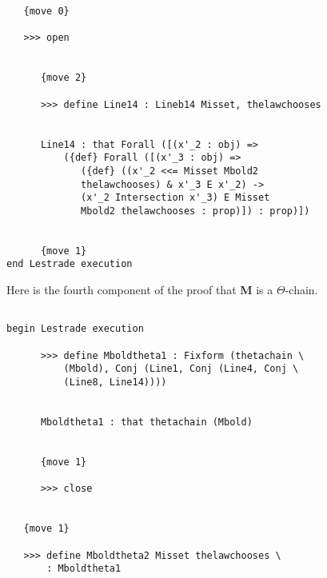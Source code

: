 \documentclass[12pt]{article}
\begin{document}
\begin{verbatim}
   {move 0}

   >>> open


      {move 2}

      >>> define Line14 : Lineb14 Misset, thelawchooses


      Line14 : that Forall ([(x'_2 : obj) => 
          ({def} Forall ([(x'_3 : obj) => 
             ({def} ((x'_2 <<= Misset Mbold2 
             thelawchooses) & x'_3 E x'_2) -> 
             (x'_2 Intersection x'_3) E Misset 
             Mbold2 thelawchooses : prop)]) : prop)])


      {move 1}
end Lestrade execution
\end{verbatim}

Here is the fourth component of the proof that {\bf M} is a $\Theta$-chain.

\begin{verbatim}

begin Lestrade execution

      >>> define Mboldtheta1 : Fixform (thetachain \
          (Mbold), Conj (Line1, Conj (Line4, Conj \
          (Line8, Line14))))


      Mboldtheta1 : that thetachain (Mbold)


      {move 1}

      >>> close


   {move 1}

   >>> define Mboldtheta2 Misset thelawchooses \
       : Mboldtheta1



\end{verbatim}
\end{document}
